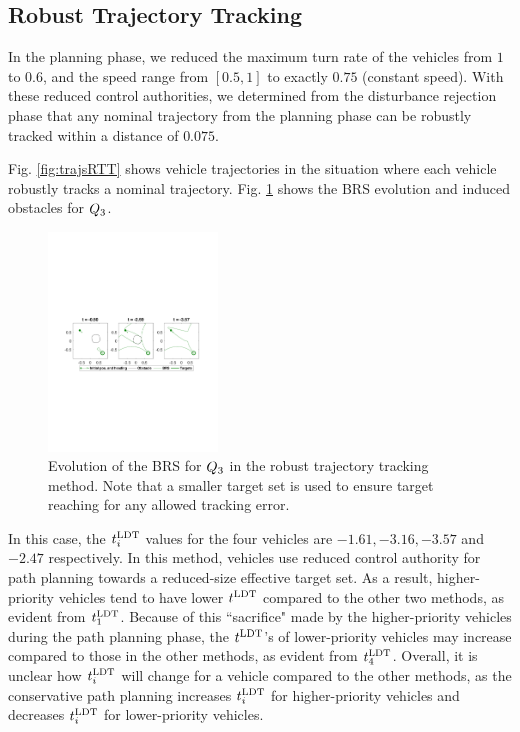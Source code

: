 \subsection{Robust Trajectory Tracking}
In the planning phase, we reduced the maximum turn rate of the vehicles from $1$ to $0.6$, and the speed range from $[0.5, 1]$ to exactly $0.75$ (constant speed). With these reduced control authorities, we determined from the disturbance rejection phase that any nominal trajectory from the planning phase can be robustly tracked within a distance of $0.075$.

Fig. \ref{fig:trajsRTT} shows vehicle trajectories in the situation where each vehicle robustly tracks a nominal trajectory. Fig. \ref{fig:rtt_rs3} shows the BRS evolution and induced obstacles for $Q_3$. %
%
%
\begin{figure}[H]
  \centering
  \includegraphics[width=0.4\textwidth]{"fig/rtt_rs3"}
  \caption{Evolution of the BRS for $Q_3$ in the robust trajectory tracking method. Note that a smaller target set is used to ensure target reaching for any allowed tracking error.}
  \label{fig:rtt_rs3}
    \vspace{-1em}
\end{figure}

In this case, the $t^\text{LDT}_i$ values for the four vehicles are $-1.61, -3.16, -3.57$ and $-2.47$ respectively. In this method, vehicles use reduced control authority for path planning towards a reduced-size effective target set. As a result, higher-priority vehicles tend to have lower $t^\text{LDT}$ compared to the other two methods, as evident from $t^\text{LDT}_1$. Because of this ``sacrifice" made by the higher-priority vehicles during the path planning phase, the $t^\text{LDT}$'s of lower-priority vehicles may increase compared to those in the other methods, as evident from $t^\text{LDT}_4$. Overall, it is unclear how $t^\text{LDT}_i$ will change for a vehicle compared to the other methods, as the conservative path planning increases $t^\text{LDT}_i$ for higher-priority vehicles and decreases $t^\text{LDT}_i$ for lower-priority vehicles.